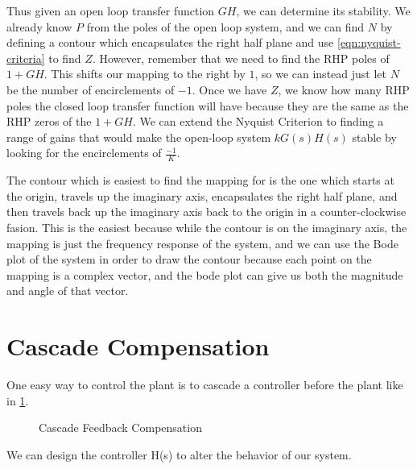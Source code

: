 Thus given an open loop transfer function $GH$, we can determine its stability.
We already know $P$ from the poles of the open loop system, and we can find $N$ by defining a contour which encapsulates the right half plane and use \cref{eqn:nyquist-criteria} to find $Z$.
However, remember that we need to find the RHP poles of $1+GH$. This shifts our mapping to the right by $1$, so we can instead just let $N$ be the number of encirclements of $-1$.
Once we have $Z$, we know how many RHP poles the closed loop transfer function will have because they are the same as the RHP zeros of the $1+GH$.
We can extend the Nyquist Criterion to finding a range of gains that would make the open-loop system $kG(s)H(s)$ stable by looking for the encirclements of $\frac{-1}{K}$.

The contour which is easiest to find the mapping for is the one which starts at the origin, travels up the imaginary axis, encapsulates the right half plane, and then travels back up the imaginary axis back to the origin in a counter-clockwise fasion.
This is the easiest because while the contour is on the imaginary axis, the mapping is just the frequency response of the system, and we can use the Bode plot of the system in order to draw the contour because each point on the mapping is a complex vector, and the bode plot can give us both the magnitude and angle of that vector.
\section{Cascade Compensation}
One easy way to control the plant is to cascade a controller before the plant like in \cref{fig:cascade-comp}.
\begin{figure}[H]
    \centering 
    \caption{Cascade Feedback Compensation}
    \label{fig:cascade-comp}
\end{figure}
We can design the controller H(s) to alter the behavior of our system.
